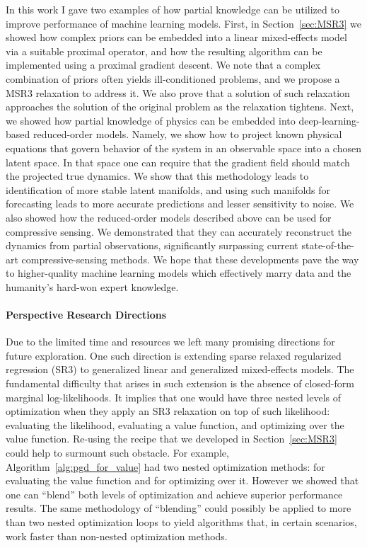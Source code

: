 In this work I gave two examples of how partial knowledge can be utilized to improve performance of machine learning models. First, in Section~\ref{sec:MSR3} we showed how complex priors can be embedded into a linear mixed-effects model via a suitable proximal operator, and how the resulting algorithm can be implemented using a proximal gradient descent. We note that a complex combination of priors often yields ill-conditioned problems, and we propose a MSR3 relaxation to address it. We also prove that a solution of such relaxation approaches the solution of the original problem as the relaxation tightens. Next, we showed how partial knowledge of physics can be embedded into deep-learning-based reduced-order models. Namely, we show how to project known physical equations that govern behavior of the system in an observable space into a chosen latent space. In that space one can require that the gradient field should match the projected true dynamics. We show that this methodology leads to identification of more stable latent manifolds, and using such manifolds for forecasting leads to more accurate predictions and lesser sensitivity to noise. We also showed how the reduced-order models described above can be used for compressive sensing. We demonstrated that they can accurately reconstruct the dynamics from partial observations, significantly surpassing current state-of-the-art compressive-sensing methods. We hope that these developments pave the way to higher-quality machine learning models which effectively marry data and the humanity's hard-won expert knowledge. 

\paragraph{Perspective Research Directions} Due to the limited time and resources we left many promising directions for future exploration. One such direction is extending sparse relaxed regularized regression (SR3) to generalized linear and generalized mixed-effects models. The fundamental difficulty that arises in such extension is the absence of closed-form marginal log-likelihoods. It implies that one would have three nested levels of optimization when they apply an SR3 relaxation on top of such likelihood: evaluating the likelihood, evaluating a value function, and optimizing over the value function. Re-using the recipe that we developed in Section~\ref{sec:MSR3} could help to surmount such obstacle. For example, Algorithm~\ref{alg:pgd_for_value} had two nested optimization methods: for evaluating the value function and for optimizing over it. However we showed that one can ``blend'' both levels of optimization and achieve superior performance results. The same methodology of ``blending'' could possibly be applied to more than two nested optimization loops to yield algorithms that, in certain scenarios, work faster than non-nested optimization methods.

